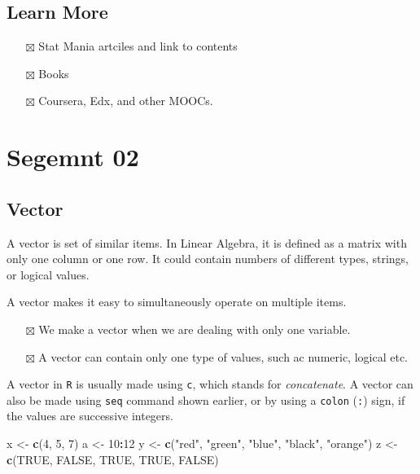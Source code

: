 \documentclass[
]{book}
\newenvironment{Shaded}{\begin{snugshade}}{\end{snugshade}}
\newcommand{\DecValTok}[1]{\textcolor[rgb]{0.00,0.00,0.81}{#1}}
\newcommand{\KeywordTok}[1]{\textcolor[rgb]{0.13,0.29,0.53}{\textbf{#1}}}
\newcommand{\NormalTok}[1]{#1}
\newcommand{\OperatorTok}[1]{\textcolor[rgb]{0.81,0.36,0.00}{\textbf{#1}}}
\newcommand{\OtherTok}[1]{\textcolor[rgb]{0.56,0.35,0.01}{#1}}
\newcommand{\StringTok}[1]{\textcolor[rgb]{0.31,0.60,0.02}{#1}}
\providecommand{\tightlist}{%
  \setlength{\itemsep}{0pt}\setlength{\parskip}{0pt}}
\begin{document}
\hypertarget{learn-more}{%
\subsection{Learn More}\label{learn-more}}

\begin{itemize}
\tightlist
\item[$\boxtimes$]
  Stat Mania artciles and link to contents
\item[$\boxtimes$]
  Books
\item[$\boxtimes$]
  Coursera, Edx, and other MOOCs.
\end{itemize}

\hypertarget{segemnt-02}{%
\section{Segemnt 02}\label{segemnt-02}}

\hypertarget{vector}{%
\subsection{Vector}\label{vector}}

A vector is set of similar items. In Linear Algebra, it is defined as a matrix with only one column or one row. It could contain numbers of different types, strings, or logical values.

A vector makes it easy to simultaneously operate on multiple items.

\begin{itemize}
\tightlist
\item[$\boxtimes$]
  We make a vector when we are dealing with only one variable.
\item[$\boxtimes$]
  A vector can contain only one type of values, such ac numeric, logical etc.
\end{itemize}

A vector in \texttt{R} is usually made using \texttt{c}, which stands for \emph{concatenate}. A vector can also be made using \texttt{seq} command shown earlier, or by using a \texttt{colon} (\texttt{:}) sign, if the values are successive integers.

\begin{Shaded}
\begin{Highlighting}[]
\NormalTok{x <-}\StringTok{ }\KeywordTok{c}\NormalTok{(}\DecValTok{4}\NormalTok{, }\DecValTok{5}\NormalTok{, }\DecValTok{7}\NormalTok{)}
\NormalTok{a <-}\StringTok{ }\DecValTok{10}\OperatorTok{:}\DecValTok{12}
\NormalTok{y <-}\StringTok{ }\KeywordTok{c}\NormalTok{(}\StringTok{"red"}\NormalTok{, }\StringTok{"green"}\NormalTok{, }\StringTok{"blue"}\NormalTok{, }\StringTok{"black"}\NormalTok{, }\StringTok{"orange"}\NormalTok{)}
\NormalTok{z <-}\StringTok{ }\KeywordTok{c}\NormalTok{(}\OtherTok{TRUE}\NormalTok{, }\OtherTok{FALSE}\NormalTok{, }\OtherTok{TRUE}\NormalTok{, }\OtherTok{TRUE}\NormalTok{, }\OtherTok{FALSE}\NormalTok{)}
\end{Highlighting}
\end{Shaded}
\end{document}
